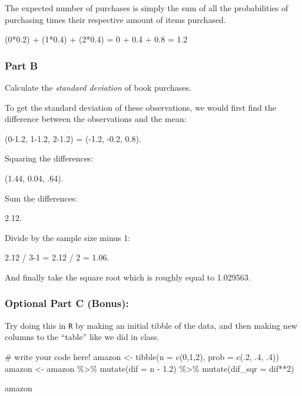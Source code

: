 \documentclass[
  letterpaper,
  DIV=11,
  numbers=noendperiod]{scrartcl}
\newenvironment{Shaded}{\begin{snugshade}}{\end{snugshade}}
\newcommand{\AttributeTok}[1]{\textcolor[rgb]{0.40,0.45,0.13}{#1}}
\newcommand{\CommentTok}[1]{\textcolor[rgb]{0.37,0.37,0.37}{#1}}
\newcommand{\DecValTok}[1]{\textcolor[rgb]{0.68,0.00,0.00}{#1}}
\newcommand{\FloatTok}[1]{\textcolor[rgb]{0.68,0.00,0.00}{#1}}
\newcommand{\FunctionTok}[1]{\textcolor[rgb]{0.28,0.35,0.67}{#1}}
\newcommand{\NormalTok}[1]{\textcolor[rgb]{0.00,0.23,0.31}{#1}}
\newcommand{\OtherTok}[1]{\textcolor[rgb]{0.00,0.23,0.31}{#1}}
\newcommand{\SpecialCharTok}[1]{\textcolor[rgb]{0.37,0.37,0.37}{#1}}
\begin{document}
The expected number of purchases is simply the sum of all the
probabilities of purchasing times their respective amount of items
purchased.

(0*0.2) + (1*0.4) + (2*0.4) = 0 + 0.4 + 0.8 = 1.2

\hypertarget{part-b-2}{%
\subsubsection{Part B}\label{part-b-2}}

Calculate the \emph{standard deviation} of book purchases.

To get the standard deviation of these observations, we would first find
the difference between the observations and the mean:

(0-1.2, 1-1.2, 2-1.2) = (-1.2, -0.2, 0.8).

Squaring the differences:

(1.44, 0.04, .64).

Sum the differences:

2.12.

Divide by the sample size minus 1:

2.12 / 3-1 = 2.12 / 2 = 1.06.

And finally take the square root which is roughly equal to 1.029563.

\hypertarget{optional-part-c-bonus}{%
\subsubsection{Optional Part C (Bonus):}\label{optional-part-c-bonus}}

Try doing this in \texttt{R} by making an initial tibble of the data,
and then making new columns to the ``table'' like we did in class.

\begin{Shaded}
\begin{Highlighting}[]
\CommentTok{\# write your code here! }
\NormalTok{amazon }\OtherTok{\textless{}{-}} \FunctionTok{tibble}\NormalTok{(}\AttributeTok{n =} \FunctionTok{c}\NormalTok{(}\DecValTok{0}\NormalTok{,}\DecValTok{1}\NormalTok{,}\DecValTok{2}\NormalTok{),}
                 \AttributeTok{prob =} \FunctionTok{c}\NormalTok{(.}\DecValTok{2}\NormalTok{, .}\DecValTok{4}\NormalTok{, .}\DecValTok{4}\NormalTok{))}
\NormalTok{amazon }\OtherTok{\textless{}{-}}\NormalTok{ amazon }\SpecialCharTok{\%\textgreater{}\%} 
  \FunctionTok{mutate}\NormalTok{(}\AttributeTok{dif =}\NormalTok{ n }\SpecialCharTok{{-}} \FloatTok{1.2}\NormalTok{) }\SpecialCharTok{\%\textgreater{}\%} 
  \FunctionTok{mutate}\NormalTok{(}\AttributeTok{dif\_sqr =}\NormalTok{ dif}\SpecialCharTok{**}\DecValTok{2}\NormalTok{)}

\NormalTok{amazon}
\end{Highlighting}
\end{Shaded}
\end{document}
